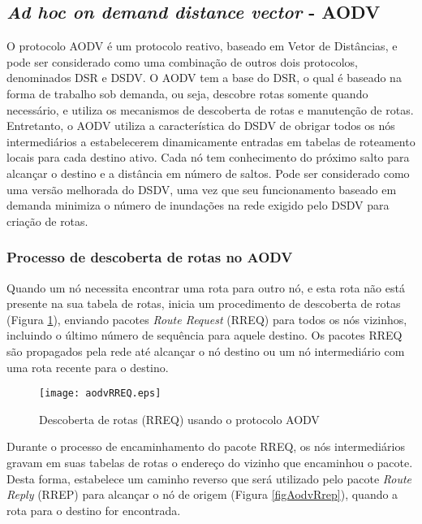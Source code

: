 \subsection{\textit{Ad hoc on demand distance vector} - AODV}\label{subAODV}
O protocolo AODV \'e um protocolo reativo\cite{gorantala}, baseado em Vetor de Dist\^ancias, e pode ser considerado como uma combina\c{c}\~ao de outros dois protocolos, denominados DSR e DSDV. 
O AODV tem a base do DSR, o qual \'e baseado na forma de trabalho sob demanda, ou seja, descobre rotas somente quando necess\'ario, e utiliza os mecanismos de descoberta de rotas e manuten\c{c}\~ao de rotas.
Entretanto, o AODV utiliza a caracter\'istica do DSDV de obrigar todos os n\'os intermedi\'arios a estabelecerem dinamicamente entradas em tabelas de roteamento locais para cada destino ativo.
Cada n\'o tem conhecimento do pr\'oximo salto para alcan\c{c}ar o destino e a dist\^ancia em n\'umero de saltos.
Pode ser considerado como uma vers\~ao melhorada do DSDV, uma vez que seu funcionamento baseado em demanda minimiza o n\'umero de inunda\c{c}\~oes na rede exigido pelo DSDV para cria\c{c}\~ao de rotas.

\subsubsection{Processo de descoberta de rotas no AODV}
Quando um n\'o necessita encontrar uma rota para outro n\'o, e esta rota n\~ao est\'a presente na sua tabela de rotas, inicia um procedimento de descoberta de rotas (Figura \ref{figAodvRreq}), enviando pacotes \textit{Route Request} (RREQ) para todos os n\'os vizinhos, incluindo o \'ultimo n\'umero de sequ\^encia para aquele destino. 
Os pacotes RREQ s\~ao propagados pela rede at\'e alcan\c{c}ar o n\'o destino ou um n\'o intermedi\'ario com uma rota recente para o destino.

\begin{figure}[H]
	\centering
	\texttt{[image: aodvRREQ.eps]}
	\caption{Descoberta de rotas (RREQ) usando o protocolo AODV \cite{pereira}}
	\label{figAodvRreq}
\end{figure}

Durante o processo de encaminhamento do pacote RREQ, os n\'os intermedi\'arios gravam em suas tabelas de rotas o endere\c{c}o do vizinho que encaminhou o pacote. 
Desta forma, estabelece um caminho reverso que ser\'a utilizado pelo pacote \textit{Route Reply} (RREP) para alcan\c{c}ar o n\'o de origem (Figura \ref{figAodvRrep}), quando a rota para o destino for encontrada.

